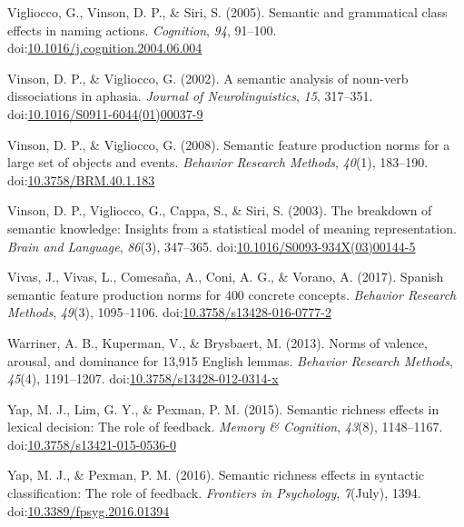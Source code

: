 \documentclass[english,,man]{apa6}
\theoremstyle{definition}
\theoremstyle{definition}
\theoremstyle{definition}
\theoremstyle{remark}
\begin{document}
\leavevmode\hypertarget{ref-Vigliocco2005}{}%
Vigliocco, G., Vinson, D. P., \& Siri, S. (2005). Semantic and
grammatical class effects in naming actions. \emph{Cognition},
\emph{94}, 91--100.
doi:\href{https://doi.org/10.1016/j.cognition.2004.06.004}{10.1016/j.cognition.2004.06.004}

\leavevmode\hypertarget{ref-Vinson2002}{}%
Vinson, D. P., \& Vigliocco, G. (2002). A semantic analysis of noun-verb
dissociations in aphasia. \emph{Journal of Neurolinguistics}, \emph{15},
317--351.
doi:\href{https://doi.org/10.1016/S0911-6044(01)00037-9}{10.1016/S0911-6044(01)00037-9}

\leavevmode\hypertarget{ref-Vinson2008}{}%
Vinson, D. P., \& Vigliocco, G. (2008). Semantic feature production
norms for a large set of objects and events. \emph{Behavior Research
Methods}, \emph{40}(1), 183--190.
doi:\href{https://doi.org/10.3758/BRM.40.1.183}{10.3758/BRM.40.1.183}

\leavevmode\hypertarget{ref-Vinson2003}{}%
Vinson, D. P., Vigliocco, G., Cappa, S., \& Siri, S. (2003). The
breakdown of semantic knowledge: Insights from a statistical model of
meaning representation. \emph{Brain and Language}, \emph{86}(3),
347--365.
doi:\href{https://doi.org/10.1016/S0093-934X(03)00144-5}{10.1016/S0093-934X(03)00144-5}

\leavevmode\hypertarget{ref-Vivas2017}{}%
Vivas, J., Vivas, L., Comesaña, A., Coni, A. G., \& Vorano, A. (2017).
Spanish semantic feature production norms for 400 concrete concepts.
\emph{Behavior Research Methods}, \emph{49}(3), 1095--1106.
doi:\href{https://doi.org/10.3758/s13428-016-0777-2}{10.3758/s13428-016-0777-2}

\leavevmode\hypertarget{ref-Warriner2013}{}%
Warriner, A. B., Kuperman, V., \& Brysbaert, M. (2013). Norms of
valence, arousal, and dominance for 13,915 English lemmas.
\emph{Behavior Research Methods}, \emph{45}(4), 1191--1207.
doi:\href{https://doi.org/10.3758/s13428-012-0314-x}{10.3758/s13428-012-0314-x}

\leavevmode\hypertarget{ref-Yap2015}{}%
Yap, M. J., Lim, G. Y., \& Pexman, P. M. (2015). Semantic richness
effects in lexical decision: The role of feedback. \emph{Memory \&
Cognition}, \emph{43}(8), 1148--1167.
doi:\href{https://doi.org/10.3758/s13421-015-0536-0}{10.3758/s13421-015-0536-0}

\leavevmode\hypertarget{ref-Yap2016}{}%
Yap, M. J., \& Pexman, P. M. (2016). Semantic richness effects in
syntactic classification: The role of feedback. \emph{Frontiers in
Psychology}, \emph{7}(July), 1394.
doi:\href{https://doi.org/10.3389/fpsyg.2016.01394}{10.3389/fpsyg.2016.01394}
\end{document}
